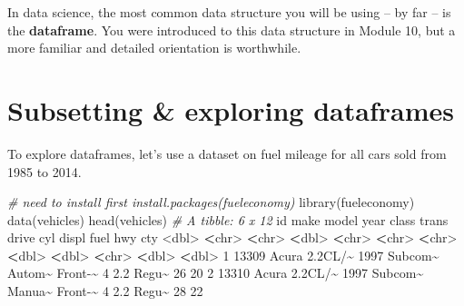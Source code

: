 \documentclass[
]{book}
\newenvironment{Shaded}{\begin{snugshade}}{\end{snugshade}}
\newcommand{\CommentTok}[1]{\textcolor[rgb]{0.56,0.35,0.01}{\textit{#1}}}
\newcommand{\DecValTok}[1]{\textcolor[rgb]{0.00,0.00,0.81}{#1}}
\newcommand{\ErrorTok}[1]{\textcolor[rgb]{0.64,0.00,0.00}{\textbf{#1}}}
\newcommand{\FloatTok}[1]{\textcolor[rgb]{0.00,0.00,0.81}{#1}}
\newcommand{\FunctionTok}[1]{\textcolor[rgb]{0.00,0.00,0.00}{#1}}
\newcommand{\NormalTok}[1]{#1}
\newcommand{\SpecialCharTok}[1]{\textcolor[rgb]{0.00,0.00,0.00}{#1}}
\begin{document}
In data science, the most common data structure you will be using -- by far -- is the \textbf{dataframe}. You were introduced to this data structure in Module 10, but a more familiar and detailed orientation is worthwhile.

\hypertarget{subsetting-exploring-dataframes}{%
\section*{Subsetting \& exploring dataframes}\label{subsetting-exploring-dataframes}}

To explore dataframes, let's use a dataset on fuel mileage for all cars sold from 1985 to 2014.

\begin{Shaded}
\begin{Highlighting}[]
\CommentTok{\# need to install first install.packages(\textquotesingle{}fueleconomy\textquotesingle{})}
\FunctionTok{library}\NormalTok{(fueleconomy)}
\FunctionTok{data}\NormalTok{(vehicles)}
\FunctionTok{head}\NormalTok{(vehicles)}
\CommentTok{\# A tibble: 6 x 12}
\NormalTok{     id make  model    year class   trans  drive     cyl displ fuel    hwy   cty}
  \SpecialCharTok{\textless{}}\NormalTok{dbl}\SpecialCharTok{\textgreater{}} \ErrorTok{\textless{}}\NormalTok{chr}\SpecialCharTok{\textgreater{}} \ErrorTok{\textless{}}\NormalTok{chr}\SpecialCharTok{\textgreater{}}   \ErrorTok{\textless{}}\NormalTok{dbl}\SpecialCharTok{\textgreater{}} \ErrorTok{\textless{}}\NormalTok{chr}\SpecialCharTok{\textgreater{}}   \ErrorTok{\textless{}}\NormalTok{chr}\SpecialCharTok{\textgreater{}}  \ErrorTok{\textless{}}\NormalTok{chr}\SpecialCharTok{\textgreater{}}   \ErrorTok{\textless{}}\NormalTok{dbl}\SpecialCharTok{\textgreater{}} \ErrorTok{\textless{}}\NormalTok{dbl}\SpecialCharTok{\textgreater{}} \ErrorTok{\textless{}}\NormalTok{chr}\SpecialCharTok{\textgreater{}} \ErrorTok{\textless{}}\NormalTok{dbl}\SpecialCharTok{\textgreater{}} \ErrorTok{\textless{}}\NormalTok{dbl}\SpecialCharTok{\textgreater{}}
\DecValTok{1} \DecValTok{13309}\NormalTok{ Acura }\FloatTok{2.2}\NormalTok{CL}\SpecialCharTok{/}\ErrorTok{\textasciitilde{}}  \DecValTok{1997}\NormalTok{ Subcom}\SpecialCharTok{\textasciitilde{}}\NormalTok{ Autom}\SpecialCharTok{\textasciitilde{}}\NormalTok{ Front}\SpecialCharTok{{-}}\ErrorTok{\textasciitilde{}}     \DecValTok{4}   \FloatTok{2.2}\NormalTok{ Regu}\SpecialCharTok{\textasciitilde{}}    \DecValTok{26}    \DecValTok{20}
\DecValTok{2} \DecValTok{13310}\NormalTok{ Acura }\FloatTok{2.2}\NormalTok{CL}\SpecialCharTok{/}\ErrorTok{\textasciitilde{}}  \DecValTok{1997}\NormalTok{ Subcom}\SpecialCharTok{\textasciitilde{}}\NormalTok{ Manua}\SpecialCharTok{\textasciitilde{}}\NormalTok{ Front}\SpecialCharTok{{-}}\ErrorTok{\textasciitilde{}}     \DecValTok{4}   \FloatTok{2.2}\NormalTok{ Regu}\SpecialCharTok{\textasciitilde{}}    \DecValTok{28}    \DecValTok{22}

\end{Highlighting}
\end{Shaded}
\end{document}

